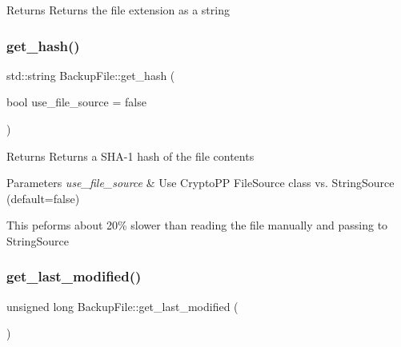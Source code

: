 \begin{DoxyReturn}{Returns}
Returns the file extension as a string 
\end{DoxyReturn}
\mbox{\label{class_backup_1_1_file_1_1_backup_file_ac799d37d7332c16e10c660123dadc30a}} 
\subsubsection{\texorpdfstring{get\+\_\+hash()}{get\_hash()}}
{\footnotesize\ttfamily std\+::string Backup\+File\+::get\+\_\+hash (\begin{DoxyParamCaption}\item[{bool}]{use\+\_\+file\+\_\+source = {\ttfamily false} }\end{DoxyParamCaption})}

\begin{DoxyReturn}{Returns}
Returns a S\+H\+A-\/1 hash of the file contents 
\end{DoxyReturn}

\begin{DoxyParams}{Parameters}
{\em use\+\_\+file\+\_\+source} & Use Crypto\+PP File\+Source class vs. String\+Source (default=false) \\
\hline
\end{DoxyParams}
This peforms about 20\% slower than reading the file manually and passing to String\+Source\mbox{\label{class_backup_1_1_file_1_1_backup_file_a2843c00b113857cc49f7494dab6f97b2}} 
\subsubsection{\texorpdfstring{get\+\_\+last\+\_\+modified()}{get\_last\_modified()}}
{\footnotesize\ttfamily unsigned long Backup\+File\+::get\+\_\+last\+\_\+modified (\begin{DoxyParamCaption}{ }\end{DoxyParamCaption})}

